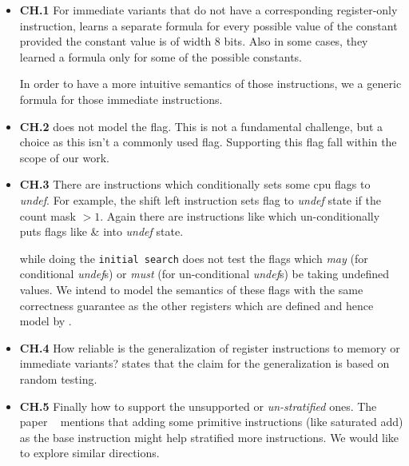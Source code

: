 \begin{itemize}
        
    
    \item  \textbf{CH.1} For immediate  variants that do not have a
    corresponding register-only instruction, \Strata  learns a separate formula
    for every possible value of the constant provided the constant value is of
    width 8 bits. Also in some cases, they learned a formula only for some of
    the possible constants.
    
    In order to have a more intuitive semantics of those instructions, we a generic formula for those  immediate instructions.

    \item \textbf{CH.2} \Strata does not model the  flag. This is not a
    fundamental challenge, but a choice as this isn't a commonly used flag.
    Supporting this flag fall within the scope of our work.
      
    \item \textbf{CH.3} There are instructions which conditionally sets some
    cpu flags to \emph{undef}. For example, the shift left instruction
     sets flag  to \emph{undef} state if the
    count mask $>1$.  Again there are instructions like  which un-conditionally puts flags like  \&  into
      \emph{undef} state.
 
    \Strata while doing the {\tt initial search} does not test the flags which
    \emph{may} (for conditional \emph{undef}s)  or \emph{must} (for
        un-conditional \emph{undef}s) be taking undefined values. We intend to
    model the semantics of these flags with the same correctness guarantee as
    the other registers which are defined and hence model by \Strata.
    
    \item \textbf{CH.4} How reliable is the generalization of register
    instructions to memory or immediate variants? \Strata states that the claim
    for the generalization is based on random testing.
    
    \item \textbf{CH.5} Finally how to support the unsupported or
    \emph{un-stratified} ones. The paper ~\cite{Heule2016a} mentions that adding
    some primitive instructions (like saturated add) as the base instruction
    might help stratified more instructions. We would like to explore similar
    directions.   

\end{itemize} 

